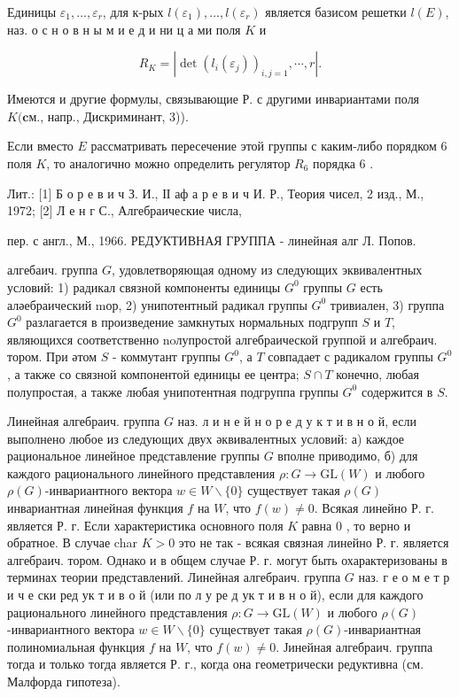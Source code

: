 \documentclass[10pt]{article}
\begin{document}
Единицы $\varepsilon_{1}, \ldots, \varepsilon_{r}$, для к-рых $l\left(\varepsilon_{1}\right), \ldots, l\left(\varepsilon_{r}\right)$ является базисом решетки $l(E)$, наз. о с н о в н ы м и е д и ни ц а ми поля $K$ и



\[

R_{K}=\left|\operatorname{det}\left(l_{i}\left(\varepsilon_{j}\right)\right)_{i, j=1}, \cdots, r\right| .

\]



Имеются и другие формулы, связывающие Р. с другими инвариантами поля $K(\mathbf{c м} .$, напр., Дискриминант, 3)).



Если вместо $E$ рассматривать пересечение этой группы с каким-либо порядком 6 поля $K$, то аналогично можно определить регулятор $R_{6}$ порядка 6 .



Лит.: [1] Б о р е в и ч З. И., ІІ аф а р е в и ч И. Р., Теория чисел, 2 изд., М., 1972; [2] Л е н г С., Алгебраические числа,

пер. с англ., М., 1966. РЕДУКТИВНАЯ ГРУППА - линейная алг Л. Попов.

алгебаич. группа $G$, удовлетворяющая одному из следующих эквивалентных условий: 1) радикал связной компоненты единицы $G^{0}$ группы $G$ есть аләебраический mор, 2) унипотентный радикал группы $G^{0}$ тривиален, 3) группа $G^{0}$ разлагается в произведение замкнутых нормальных подгрупп $S$ и $T$, являющихся соответственно noлупростой алгебраической группой и алгебраич. тором. При әтом $S$ - коммутант группы $G^{0}$, а $T$ совпадает с радикалом группы $G^{0}$, а также со связной компонентой единицы ее центра; $S \cap T$ конечно, любая полупростая, а также любая унипотентная подгруппа группы $G^{0}$ содержится в $S$.



Линейная алгебраич. группа $G$ наз. л и н е й н о р е д у к т и в н о й, если выполнено любое из следующих двух әквивалентных условий: а) каждое рациональное линейное представление группы $G$ вполне приводимо, б) для каждого рационального линейного представления $\rho: G \rightarrow \mathrm{GL}(W)$ и любого $\rho(G)$-инвариантного вектора $w \in W \backslash\{0\}$ существует такая $\rho(G)$ инвариантная линейная функция $f$ на $W$, что $f(w) \neq 0$. Всякая линейно Р. г. является Р. г. Если характеристика основного поля $K$ равна 0 , то верно и обратное. В случае char $K>0$ это не так - всякая связная линейно Р. г. является алгебраич. тором. Однако и в общем случае Р. г. могут быть охарактеризованы в терминах теории представлений. Линейная алгебраич. группа $G$ наз. г е о м е т р и ч е ски ред ук т и в о й (или по л у ре д ук т и в н о й), если для каждого рационального линейного представления $\rho: G \rightarrow \mathrm{GL}(W)$ и любого $\rho(G)$-инвариантного вектора $w \in W \backslash\{0\}$ существует такая $\rho(G)$-инвариантная полиномиальная функция $f$ на $W$, что $f(w) \neq 0$. Јинейная алгебраич. группа тогда и только тогда является Р. г., когда она геометрически редуктивна (см. Малфорда гипотеза).
\end{document}
